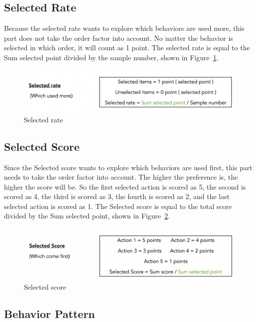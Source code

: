 \subsection{Selected Rate}
Because the selected rate wants to explore which behaviors are used more, this part does not take the order factor into account. No matter the behavior is selected in which order, it will count as 1 point. The selected rate is equal to the Sum selected point divided by the sample number, shown in Figure~\ref{fig10}.

\begin{figure}[h]
  \includegraphics[width=\linewidth]{Figure/Figure10.png}
  \centering
  \caption{Selected rate }
  \label{fig10}
\end{figure}

\subsection{Selected Score}

Since the Selected score wants to explore which behaviors are used first, this part needs to take the order factor into account. The higher the preference is, the higher the score will be. So the first selected action is scored as 5, the second is scored as 4, the third is scored as 3, the fourth is scored as 2, and the last selected action is scored as 1. The Selected score is equal to the total score divided by the Sum selected point, shown in Figure~\ref{fig11}.

\begin{figure}[h]
  \includegraphics[width=\linewidth]{Figure/Figure11.png}
  \centering
  \caption{Selected score}
  \label{fig11}
\end{figure}

\subsection{Behavior Pattern}

